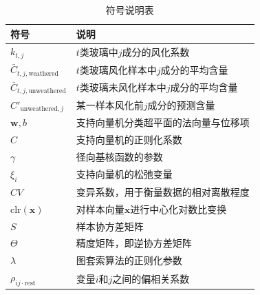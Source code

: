 \begin{table}[H]
	\centering
	\caption{符号说明表}
	\begin{tabular}{ll}
		\toprule
		\textbf{符号}                        & \textbf{说明}                     \\
		\midrule
		$k_{t,j}$                          & $t$类玻璃中$j$成分的风化系数               \\
		$\bar{C}_{t,j,\text{weathered}}$   & $t$类玻璃风化样本中$j$成分的平均含量           \\
		$\bar{C}_{t,j,\text{unweathered}}$ & $t$类玻璃未风化样本中$j$成分的平均含量          \\
		$C'_{\text{unweathered}, j}$       & 某一样本风化前$j$成分的预测含量               \\
		$\boldsymbol{w}, b$                & 支持向量机分类超平面的法向量与位移项              \\
		$C$                                & 支持向量机的正则化系数                     \\
		$\gamma$                           & 径向基核函数的参数                       \\
		$\xi_i$                            & 支持向量机的松弛变量                      \\
		$CV$                               & 变异系数，用于衡量数据的相对离散程度              \\
		$\text{clr}(\boldsymbol{x})$       & 对样本向量$\boldsymbol{x}$进行中心化对数比变换 \\
		$S$                                & 样本协方差矩阵                         \\
		$\Theta$                           & 精度矩阵，即逆协方差矩阵                    \\
		$\lambda$                          & 图套索算法的正则化参数                     \\
		$\rho_{ij \cdot \text{rest}}$      & 变量$i$和$j$之间的偏相关系数               \\
		
		

		\bottomrule
	\end{tabular}
\end{table}